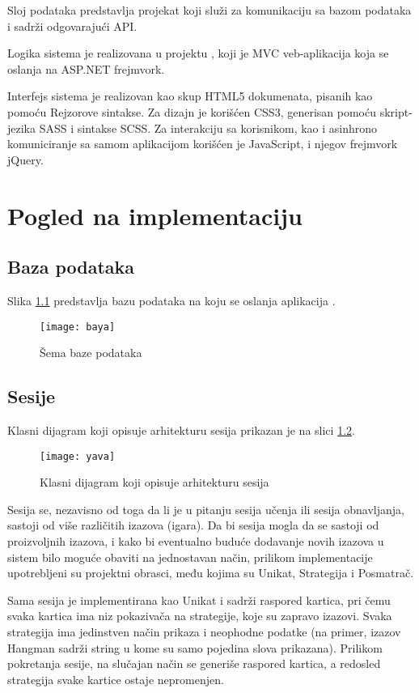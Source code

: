 Sloj podataka predstavlja projekat  koji služi za komunikaciju sa bazom podataka i sadrži odgovarajući API.

Logika sistema je realizovana u projektu , koji je MVC veb-aplikacija koja se oslanja na ASP.NET frejmvork.

Interfejs sistema je realizovan kao skup HTML5 dokumenata, pisanih kao  pomoću Rejzorove sintakse.
Za dizajn je korišćen CSS3, generisan pomoću skript-jezika SASS i sintakse SCSS.
Za interakciju sa korisnikom, kao i asinhrono komuniciranje sa samom aplikacijom korišćen je JavaScript, i njegov frejmvork jQuery.

\chapter{Pogled na implementaciju}

\section{Baza podataka}
Slika \ref{fig:sema-baza} predstavlja bazu podataka na koju se oslanja aplikacija \UpamtiOnline.

\begin{figure}[htbp]
  \centering
  \texttt{[image: baya]}
  \caption{Šema baze podataka}
  \label{fig:sema-baza}
\end{figure}

\section{Sesije}
Klasni dijagram koji opisuje arhitekturu sesija prikazan je na slici \ref{fig:sesije}.

\begin{figure}
  \centering
  \texttt{[image: yava]}
  \caption{Klasni dijagram koji opisuje arhitekturu sesija}
  \label{fig:sesije}
\end{figure}

Sesija se, nezavisno od toga da li je u pitanju sesija učenja ili sesija obnavljanja, sastoji od više različitih izazova (igara).
Da bi sesija mogla da se sastoji od proizvoljnih izazova, i kako bi eventualno buduće dodavanje novih izazova u sistem bilo moguće obaviti na jednostavan način, prilikom implementacije upotrebljeni su projektni obrasci, među kojima su Unikat, Strategija i Posmatrač.

Sama sesija je implementirana kao Unikat i sadrži raspored kartica, pri čemu svaka kartica ima niz pokazivača na strategije, koje su zapravo izazovi.
Svaka strategija ima jedinstven način prikaza i neophodne podatke (na primer, izazov Hangman sadrži string u kome su samo pojedina slova prikazana).
Prilikom pokretanja sesije, na slučajan način se generiše raspored kartica, a redosled strategija svake kartice ostaje nepromenjen.

